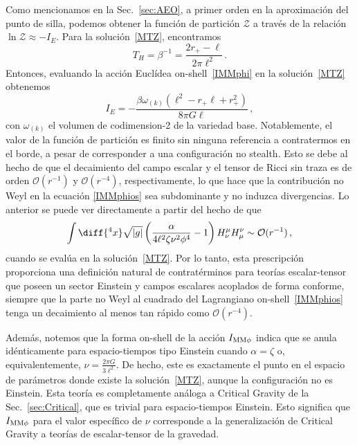 \documentclass[../Main.tex]{subfiles}
\begin{document}
Como mencionamos en la Sec.~\ref{sec:AEO}, a primer orden en la aproximación del punto de silla, podemos obtener la función de partición $\mathcal{Z}$ a través de la relación $\ln \mathcal{Z} \approx - I_E$. Para la solución~\eqref{MTZ}, encontramos
\begin{equation}
T_H = \beta^{-1} = \frac{2r_+-\ell}{2\pi\ell^2}\,.
\end{equation}
Entonces, evaluando la acción Euclídea on-shell~\eqref{IMMphi} en la solución~\eqref{MTZ} obtenemos
\begin{equation}
    I_E = - \frac{\beta\omega_{(k)}\left(\ell^2-r_+\ell+r_+^2 \right)}{8\pi G\ell}\,,
\end{equation}
con $\omega_{(k)}$ el volumen de codimension-2 de la variedad base.  Notablemente, el valor de la función de partición es finito sin ninguna referencia a contratermos en el borde, a pesar de corresponder a una configuración no stealth. Esto se debe al hecho de que el decaimiento del campo escalar y el tensor de Ricci sin traza es de orden $\mathcal{O} \left(r^{-1}\right)$ y $\mathcal{O} \left(r^{-4}\right)$, respectivamente, lo que hace que la contribución no Weyl en la ecuación \eqref{IMMphios} sea subdominante y no induzca divergencias. Lo anterior se puede ver directamente a partir del hecho de que
\begin{align}
\int\diff{^4x}\sqrt{|g|}\left( \frac{\alpha}{4 \ell^{2} \zeta \nu^{2} \phi^{4}}-1\right) H^{\mu}_{\nu} H^{\nu}_{\mu} \sim \mathcal{O}(r^{-1})\,,
\end{align}
cuando se evalúa en la solución~\eqref{MTZ}. Por lo tanto, esta prescripción proporciona una definición natural de contratérminos para teorías escalar-tensor que poseen un sector Einstein y campos escalares acoplados de forma conforme, siempre que la parte no Weyl al cuadrado del Lagrangiano on-shell~\eqref{IMMphios} tenga un decaimiento al menos tan rápido como $\mathcal{O} \left(r^{-4}\right)$.

Además, notemos que la forma on-shell de la acción $I_{\rm MM\phi}$ indica que se anula idénticamente para espacio-tiempos tipo Einstein cuando $\alpha=\zeta$ o, equivalentemente, $\nu=\frac{2\pi G}{3\ell^2}$. De hecho, este es exactamente el punto en el espacio de parámetros donde existe la solución~\eqref{MTZ}, aunque la configuración no es Einstein. Esta teoría es completamente análoga a Critical Gravity de la Sec.~\ref{sec:Critical}, que es trivial para espacio-tiempos Einstein. Esto significa que $I_{\rm MM\phi}$ para el valor específico de $\nu$ corresponde a la generalización de Critical Gravity a teorías de escalar-tensor de la gravedad.



\biblio %
\end{document}
